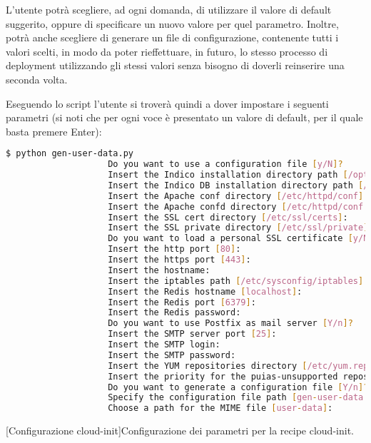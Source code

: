             L'utente potrà scegliere, ad ogni domanda, di utilizzare il valore di default suggerito, oppure di specificare un nuovo valore per quel parametro. Inoltre, potrà anche scegliere di generare un file di configurazione, contenente tutti i valori scelti, in modo da poter rieffettuare, in futuro, lo stesso processo di deployment utilizzando gli stessi valori senza bisogno di doverli reinserire una seconda volta.
            
            Eseguendo lo script  l'utente si troverà quindi a dover impostare i seguenti parametri (si noti che per ogni voce è presentato un valore di default, per il quale basta premere Enter):
            
            \begin{center}
                \begin{lstlisting}[language=bash, gobble=18, deletekeywords={login, for}]
                    $ python gen-user-data.py 
                    Do you want to use a configuration file [y/N]? 
                    Insert the Indico installation directory path [/opt/indico]: 
                    Insert the Indico DB installation directory path [/opt/indico/db]: 
                    Insert the Apache conf directory [/etc/httpd/conf]: 
                    Insert the Apache confd directory [/etc/httpd/conf.d]: 
                    Insert the SSL cert directory [/etc/ssl/certs]: 
                    Insert the SSL private directory [/etc/ssl/private]: 
                    Do you want to load a personal SSL certificate [y/N]? 
                    Insert the http port [80]: 
                    Insert the https port [443]: 
                    Insert the hostname: 
                    Insert the iptables path [/etc/sysconfig/iptables]: 
                    Insert the Redis hostname [localhost]: 
                    Insert the Redis port [6379]: 
                    Insert the Redis password: 
                    Do you want to use Postfix as mail server [Y/n]? 
                    Insert the SMTP server port [25]: 
                    Insert the SMTP login: 
                    Insert the SMTP password: 
                    Insert the YUM repositories directory [/etc/yum.repos.d]: 
                    Insert the priority for the puias-unsupported repository [19]: 
                    Do you want to generate a configuration file [Y/n]? 
                    Specify the configuration file path [gen-user-data.conf]: 
                    Choose a path for the MIME file [user-data]:
                \end{lstlisting}
                \captionsetup{textformat=empty,labelformat=empty} \vspace{-2em}
                [Configurazione cloud-init]{Configurazione dei parametri per la recipe cloud-init.}
            \end{center}
            
